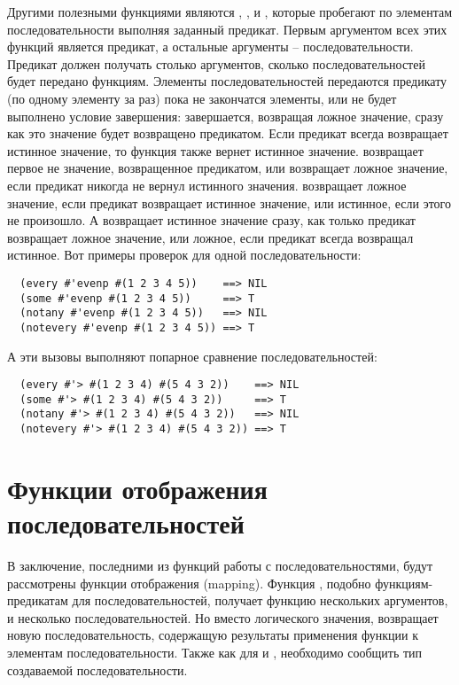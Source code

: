 Другими полезными функциями являются , ,  и
, которые пробегают по элементам последовательности выполняя заданный
предикат.  Первым аргументом всех этих функций является предикат, а остальные аргументы --
последовательности.  Предикат должен получать столько аргументов, сколько
последовательностей будет передано функциям.  Элементы последовательностей передаются
предикату (по одному элементу за раз) пока не закончатся элементы, или не будет выполнено
условие завершения:  завершается, возвращая ложное значение, сразу как это
значение будет возвращено предикатом.  Если предикат всегда возвращает истинное значение,
то функция также вернет истинное значение.   возвращает первое не 
значение, возвращенное предикатом, или возвращает ложное значение, если предикат никогда
не вернул истинного значения.  возвращает ложное значение, если предикат
возвращает истинное значение, или истинное, если этого не произошло.  А 
возвращает истинное значение сразу, как только предикат возвращает ложное значение, или
ложное, если предикат всегда возвращал истинное.  Вот примеры проверок для одной
последовательности:

\begin{verbatim}
  (every #'evenp #(1 2 3 4 5))    ==> NIL
  (some #'evenp #(1 2 3 4 5))     ==> T
  (notany #'evenp #(1 2 3 4 5))   ==> NIL
  (notevery #'evenp #(1 2 3 4 5)) ==> T
\end{verbatim}

А эти вызовы выполняют попарное сравнение последовательностей:

\begin{verbatim}
  (every #'> #(1 2 3 4) #(5 4 3 2))    ==> NIL
  (some #'> #(1 2 3 4) #(5 4 3 2))     ==> T
  (notany #'> #(1 2 3 4) #(5 4 3 2))   ==> NIL
  (notevery #'> #(1 2 3 4) #(5 4 3 2)) ==> T
\end{verbatim}

\section{Функции отображения последовательностей}

В заключение, последними из функций работы с последовательностями, будут рассмотрены
функции отображения (mapping).  Функция , подобно функциям-предикатам для
последовательностей, получает функцию нескольких аргументов, и несколько
последовательностей.  Но вместо логического значения,  возвращает новую
последовательность, содержащую результаты применения функции к элементам
последовательности.  Также как для  и , 
необходимо сообщить тип создаваемой последовательности.

